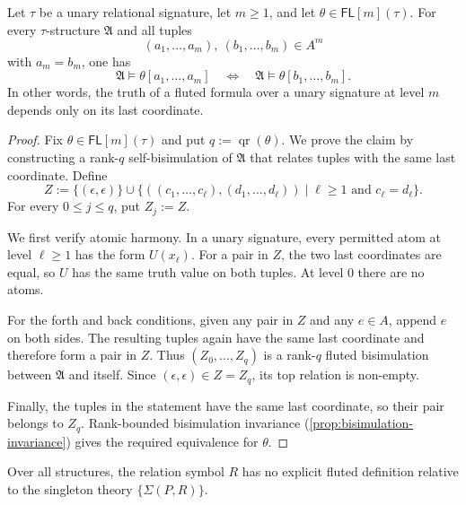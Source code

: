 \documentclass{lmcs}
\newcommand{\FL}{\mathsf{FL}}
\newcommand{\qr}{\operatorname{qr}}
\newcommand{\A}{\mathfrak{A}}
\begin{document}
\begin{lem}\label{lem:last-coordinate}
Let $\tau$ be a unary relational signature, let $m\geq1$, and let
$\theta\in\FL[m](\tau)$.  For every $\tau$-structure $\A$ and all tuples
\[
   (a_1,\ldots,a_m),\ (b_1,\ldots,b_m)\in A^m
\]
with $a_m=b_m$, one has
\[
  \A\models\theta[a_1,\ldots,a_m]
  \quad\Longleftrightarrow\quad
  \A\models\theta[b_1,\ldots,b_m].
\]
In other words, the truth of a fluted formula over a unary signature at level
$m$ depends only on its last coordinate.
\end{lem}

\begin{proof}
Fix $\theta\in\FL[m](\tau)$ and put $q:=\qr(\theta)$.  We prove the claim by
constructing a rank-$q$ self-bisimulation of $\A$ that relates tuples with the
same last coordinate.  Define
\[
  Z:=\{(\epsilon,\epsilon)\}
     \cup
     \bigl\{((c_1,\ldots,c_\ell),(d_1,\ldots,d_\ell))\mid
       \ell\geq1\text{ and }c_\ell=d_\ell\bigr\}.
\]
For every $0\leq j\leq q$, put $Z_j:=Z$.

We first verify atomic harmony.  In a unary signature, every permitted atom
at level $\ell\geq1$ has the form $U(x_\ell)$.  For a pair in $Z$, the two last
coordinates are equal, so $U$ has the same truth value on both tuples.  At
level $0$ there are no atoms.

For the forth and back conditions, given any pair in $Z$ and any $e\in A$,
append $e$ on both sides.  The resulting tuples again have the same last
coordinate and therefore form a pair in $Z$.  Thus
$(Z_0,\ldots,Z_q)$ is a rank-$q$ fluted bisimulation between $\A$ and itself.
Since $(\epsilon,\epsilon)\in Z=Z_q$, its top relation is non-empty.

Finally, the tuples in the statement have the same last coordinate, so their
pair belongs to $Z_q$.  Rank-bounded bisimulation invariance
(\cref{prop:bisimulation-invariance}) gives the required equivalence for
$\theta$.
\end{proof}

\begin{thm}\label{thm:wbdp-proof}
Over all structures, the relation symbol $R$ has no explicit fluted definition
relative to the singleton theory $\{\Sigma(P,R)\}$.
\end{thm}
\end{document}

